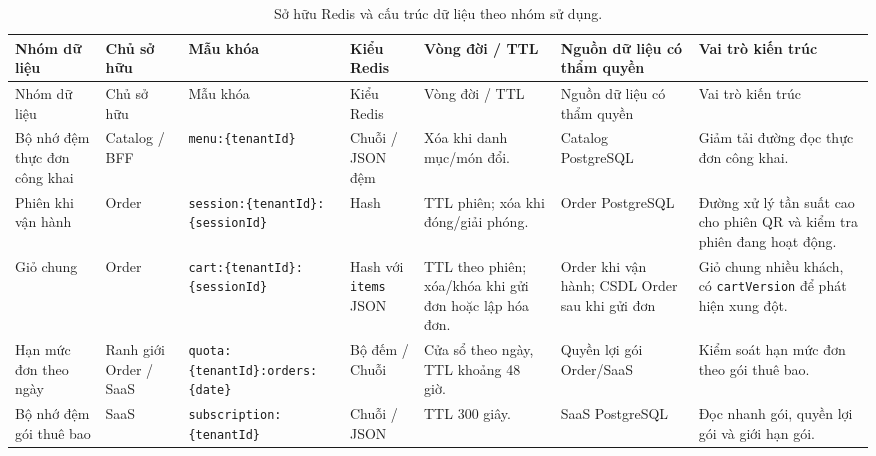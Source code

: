 {\scriptsize
\setlength{\tabcolsep}{1pt}
\begin{longtable}{>{\raggedright\arraybackslash}p{}>{\raggedright\arraybackslash}p{}>{\raggedright\arraybackslash}p{}>{\raggedright\arraybackslash}p{}>{\raggedright\arraybackslash}p{}>{\raggedright\arraybackslash}p{}>{\raggedright\arraybackslash}p{}}
  \caption{Sở hữu Redis và cấu trúc dữ liệu theo nhóm sử dụng.}
  \label{tab:chapter4-redis-data-structures}\\
  \toprule
  Nhóm dữ liệu & Chủ sở hữu & Mẫu khóa & Kiểu Redis & Vòng đời / TTL & Nguồn dữ liệu có thẩm quyền & Vai trò kiến trúc \\
  \midrule
  \endfirsthead
  \toprule
  Nhóm dữ liệu & Chủ sở hữu & Mẫu khóa & Kiểu Redis & Vòng đời / TTL & Nguồn dữ liệu có thẩm quyền & Vai trò kiến trúc \\
  \midrule
  \endhead
  \bottomrule
  \endfoot
  Bộ nhớ đệm thực đơn công khai & Catalog / BFF & \texttt{menu:\{tenantId\}} & Chuỗi / JSON đệm & Xóa khi danh mục/món đổi. & Catalog PostgreSQL & Giảm tải đường đọc thực đơn công khai. \\
  Phiên khi vận hành & Order & \texttt{session:}\newline\texttt{\{tenantId\}:}\newline\texttt{\{sessionId\}} & Hash & TTL phiên; xóa khi đóng/giải phóng. & Order PostgreSQL & Đường xử lý tần suất cao cho phiên QR và kiểm tra phiên đang hoạt động. \\
  Giỏ chung & Order & \texttt{cart:\{tenantId\}:}\newline\texttt{\{sessionId\}} & Hash với \texttt{items} JSON & TTL theo phiên; xóa/khóa khi gửi đơn hoặc lập hóa đơn. & Order khi vận hành; CSDL Order sau khi gửi đơn & Giỏ chung nhiều khách, có \texttt{cartVersion} để phát hiện xung đột. \\
  Hạn mức đơn theo ngày & Ranh giới Order / SaaS & \texttt{quota:}\newline\texttt{\{tenantId\}:}\newline\texttt{orders:\{date\}} & Bộ đếm / Chuỗi & Cửa sổ theo ngày, TTL khoảng 48 giờ. & Quyền lợi gói Order/SaaS & Kiểm soát hạn mức đơn theo gói thuê bao. \\
  Bộ nhớ đệm gói thuê bao & SaaS & \texttt{subscription:}\newline\texttt{\{tenantId\}} & Chuỗi / JSON & TTL 300 giây. & SaaS PostgreSQL & Đọc nhanh gói, quyền lợi gói và giới hạn gói. \\

\end{longtable}}
